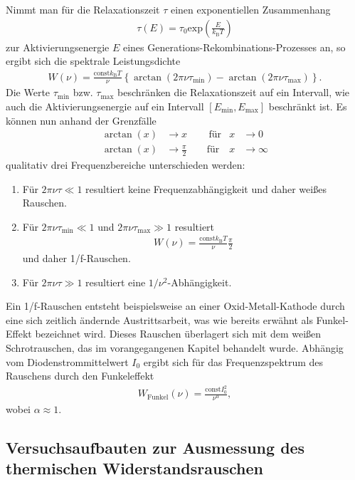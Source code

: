 Nimmt man für die Relaxationszeit $\tau$ einen exponentiellen Zusammenhang
\begin{align}
  \tau(E) = \tau_0 \text{exp}\left(\frac{E}{k_\text{B}T}\right)
\end{align}
zur Aktivierungsenergie $E$ eines Generations-Rekombinations-Prozesses an, so ergibt sich die spektrale Leistungsdichte
\begin{align}
  W(\nu) = \frac{\text{const} k_\text{B} T}{\nu} \left\{ \arctan{(2\pi\nu\tau_\text{min})} - \arctan{(2\pi\nu\tau_\text{max})} \right\}.
\end{align}
Die Werte $\tau_\text{min}$ bzw. $\tau_\text{max}$ beschränken die Relaxationszeit auf ein Intervall, wie auch
die Aktivierungsenergie auf ein Intervall $[E_\text{min}, E_\text{max}]$ beschränkt ist.
Es können nun anhand der Grenzfälle
\begin{align}
  \arctan{(x)} &\to x \qquad \, \text{für} &x &\to 0 \\
  \arctan{(x)} &\to \frac{\pi}{2} \qquad \text{für} &x &\to \infty
\end{align}
qualitativ drei Frequenzbereiche unterschieden werden:
\begin{enumerate}
  \item Für $2\pi\nu\tau \ll 1$ resultiert keine Frequenzabhängigkeit und daher weißes Rauschen.
  \item Für $2\pi\nu\tau_\text{min} \ll 1$ und $2\pi\nu\tau_\text{max} \gg 1$ resultiert
  \begin{align}
    W(\nu) = \frac{\text{const} k_\text{B} T}{\nu} \frac{\pi}{2}
  \end{align}
  und daher 1/f-Rauschen.
  \item Für $2\pi\nu\tau \gg 1$ resultiert eine $1/\nu^2$-Abhängigkeit.
\end{enumerate}
Ein 1/f-Rauschen entsteht beispielsweise an einer Oxid-Metall-Kathode durch eine sich zeitlich ändernde Austrittsarbeit,
was wie bereits erwähnt als Funkel-Effekt bezeichnet wird. Dieses Rauschen überlagert sich mit dem weißen Schrotrauschen, das
im vorangegangenen Kapitel behandelt wurde.
Abhängig vom Diodenstrommittelwert $I_0$ ergibt sich für das Frequenzspektrum des Rauschens durch den Funkeleffekt
\begin{align}
  W_\text{Funkel}(\nu) = \frac{\text{const} I_0^2}{\nu^\alpha},
\end{align}
wobei $\alpha \approx 1$.

\subsection{Versuchsaufbauten zur Ausmessung des thermischen Widerstandsrauschen}

